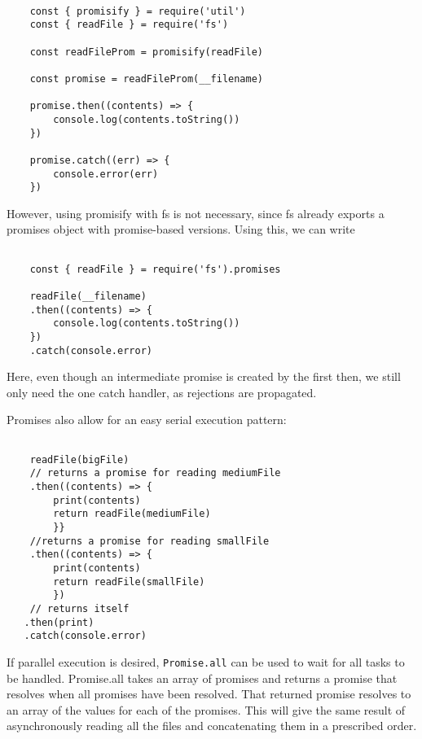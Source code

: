 \documentclass{scrartcl}
\begin{document}
\begin{lstlisting}[style=ES6]

    const { promisify } = require('util')
    const { readFile } = require('fs')

    const readFileProm = promisify(readFile)

    const promise = readFileProm(__filename)

    promise.then((contents) => {
        console.log(contents.toString())
    })

    promise.catch((err) => {
        console.error(err)
    })
\end{lstlisting}

However, using promisify with fs is not necessary, since fs already exports a promises object with promise-based versions. Using this, we can write

\begin{lstlisting}[style=ES6]

    const { readFile } = require('fs').promises

    readFile(__filename)
    .then((contents) => {
        console.log(contents.toString())
    })
    .catch(console.error)
\end{lstlisting}

Here, even though an intermediate promise is created by the first then, we still only need the one catch handler, as rejections are propagated.

Promises also allow for an easy serial execution pattern:

\begin{lstlisting}[style=ES6]

    readFile(bigFile)
    // returns a promise for reading mediumFile
    .then((contents) => {
        print(contents)
        return readFile(mediumFile)
        }}
    //returns a promise for reading smallFile
    .then((contents) => {
        print(contents)
        return readFile(smallFile)
        })
    // returns itself
   .then(print)
   .catch(console.error)

\end{lstlisting}

If parallel execution is desired, \lstinline|Promise.all| can be used to wait for all tasks to be handled. Promise.all takes an array of promises and returns a promise that resolves when all promises have been resolved. That returned promise resolves to an array of the values for each of the promises. This will give the same result of asynchronously reading all the files and concatenating them in a prescribed order.
\end{document}
